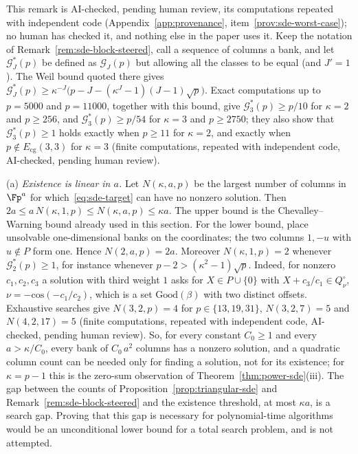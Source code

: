 \begin{remark}
\label{rem:sde-worst-case}
This remark is AI-checked, pending human review, its computations repeated with independent code (Appendix~\ref{app:provenance}, item~\ref{prov:sde-worst-case}); no human has checked it, and nothing else in the paper uses it. Keep the notation of Remark~\ref{rem:sde-block-steered}, call a sequence of columns a bank, and let $\mathcal{G}^*_J(p)$ be defined as $\mathcal{G}_J(p)$ but allowing all the classes to be equal (and $J'=1$). The Weil bound quoted there gives $\mathcal{G}^*_J(p)\ge\kappa^{-J}\bigl(p-J-(\kappa^J-1)(J-1)\sqrt p\bigr)$. Exact computations up to $p=5000$ and $p=11000$, together with this bound, give $\mathcal{G}^*_3(p)\ge p/10$ for $\kappa=2$ and $p\ge256$, and $\mathcal{G}^*_3(p)\ge p/54$ for $\kappa=3$ and $p\ge2750$; they also show that $\mathcal{G}^*_3(p)\ge1$ holds exactly when $p\ge11$ for $\kappa=2$, and exactly when $p\notin E_{\mathrm{cg}}(3,3)$ for $\kappa=3$ (finite computations, repeated with independent code, AI-checked, pending human review).

\textup{(a)} \emph{Existence is linear in $a$.} Let $N(\kappa,a,p)$ be the largest number of columns in $\Fp^a$ for which~\eqref{eq:sde-target} can have no nonzero solution. Then $2a\le a\,N(\kappa,1,p)\le N(\kappa,a,p)\le\kappa a$. The upper bound is the Chevalley--Warning bound already used in this section. For the lower bound, place unsolvable one-dimensional banks on the coordinates; the two columns $1,-u$ with $u\notin P$ form one. Hence $N(2,a,p)=2a$. Moreover $N(\kappa,1,p)=2$ whenever $\mathcal{G}^*_2(p)\ge1$, for instance whenever $p-2>(\kappa^2-1)\sqrt p$. Indeed, for nonzero $c_1,c_2,c_3$ a solution with third weight $1$ asks for $X\in P\cup\{0\}$ with $X+c_3/c_1\in Q^\circ_{\nu}$, $\nu=-\mathrm{cos}(-c_1/c_2)$, which is a set $\mathrm{Good}(\beta)$ with two distinct offsets. Exhaustive searches give $N(3,2,p)=4$ for $p\in\{13,19,31\}$, $N(3,2,7)=5$ and $N(4,2,17)=5$ (finite computations, repeated with independent code, AI-checked, pending human review). So, for every constant $C_0\ge1$ and every $a>\kappa/C_0$, every bank of $C_0\,a^2$ columns has a nonzero solution, and a quadratic column count can be needed only for finding a solution, not for its existence; for $\kappa=p-1$ this is the zero-sum observation of Theorem~\ref{thm:power-sde}(iii). The gap between the counts of Proposition~\ref{prop:triangular-sde} and Remark~\ref{rem:sde-block-steered} and the existence threshold, at most $\kappa a$, is a search gap. Proving that this gap is necessary for polynomial-time algorithms would be an unconditional lower bound for a total search problem, and is not attempted.


\end{remark}

